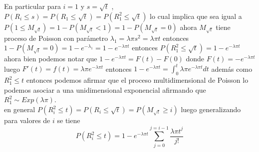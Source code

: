 \documentclass{article}
\begin{document}
En particular para $i=1$ y $s = \sqrt{t}$ ,\\
$P(R_i\leq s) = P(R_1\leq\sqrt{t}) = P(R^2_1 \leq\sqrt{t})$ lo cual implica que sea igual a $P(1 \leq M_{\sqrt{t}}) = 1-P(M_{\sqrt{t}}<1) = 1-P(M_{\sqrt{t}}=0)$ ahora $M_{\sqrt{t}}$ tiene proceso de Poisson con  parámetro $\lambda_1 = \lambda\pi s^2 = \lambda\pi t$ entonces $1- P(M_{\sqrt{t}}=0) = 1- e^{-\lambda_1} = 1-e^{-\lambda\pi t} $ entonces $P(R^2_1 \leq\sqrt{t})= 1-e^{-\lambda\pi t}$ ahora bien podemos notar que $ 1-e^{-\lambda\pi t} = F(t)-F(0)$ donde $F(t) = -e^{-\lambda\pi t}$ luego $F'(t) = f(t) = \lambda\pi e^{-\lambda\pi t}$ entonces $1-e^{-\lambda\pi t} = \int_{0}^{t}\lambda\pi e^{-\lambda\pi t}dt$ además como $R^2_1\leq t$ entonces podemos afirmar que el proceso multidimensional de Poisson lo podemos asociar a una unidimensional exponencial afirmando que $R^2_1\sim Exp(\lambda\pi)$. \\
en general $P(R^2_i \leq t) = P(R_i \leq\sqrt{t}) = P(M_{\sqrt{t}}\geq i)$
luego generalizando para valores de $i$ se tiene $$ P(R^2_i \leq t) = 1-e^{-\lambda\pi t}\sum_{j=0}^{j=i-1}\frac{{\lambda\pi t}^j}{j!}$$
\end{document}

